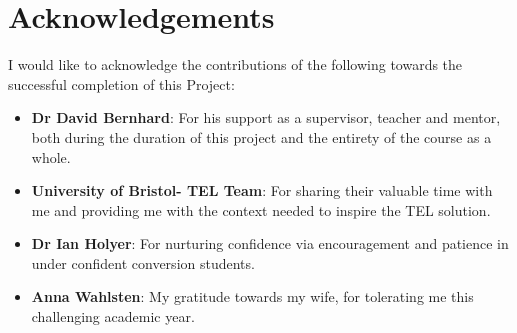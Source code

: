 \chapter*{Acknowledgements}
\begin{SingleSpace}

I would like to acknowledge the contributions of the following towards the successful completion of this Project:

\begin{itemize}

    \item \textbf{Dr David Bernhard}: For his support as a supervisor, teacher and mentor, both during the duration of this project and the entirety of the course as a whole.
    
    \item \textbf{University of Bristol- TEL Team}: For sharing their valuable time with me and providing me with the context needed to inspire the TEL solution.
    
    \item \textbf{Dr Ian Holyer}: For nurturing confidence via encouragement and patience in under confident conversion students.

    \item \textbf{Anna Wahlsten}: My gratitude towards my wife, for tolerating me this challenging academic year.
    
\end{itemize}
\end{SingleSpace}